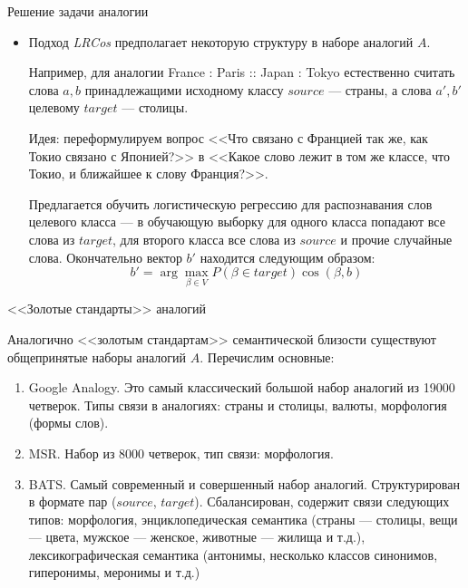 \documentclass[9pt]{beamer}
\begin{document}
\begin{frame}{Решение задачи аналогии}
\begin{itemize}
\item Подход \textit{LRCos} предполагает некоторую структуру в наборе аналогий $A$. 
\vspace{\baselineskip}

Например, для аналогии France : Paris :: Japan : Tokyo естественно считать слова $a, b$ принадлежащими исходному классу $source$ --- страны, а слова $a', b'$ целевому $target$ --- столицы. 
\vspace{\baselineskip}

Идея: переформулируем вопрос <<Что связано с Францией так же, как Токио связано с Японией?>> в <<Какое слово лежит в том же классе, что Токио, и ближайшее к слову Франция?>>.
\vspace{\baselineskip}

Предлагается обучить логистическую регрессию для распознавания слов целевого класса --- в обучающую выборку для одного класса попадают все слова из $target$, для второго класса все слова из $source$ и прочие случайные слова. Окончательно вектор $b'$ находится следующим образом:
    \begin{equation}
        b' = \arg \max_{\beta \in V} P(\beta \in target) \cos(\beta, b)
    \end{equation}    
\end{itemize}
    
\end{frame}

\begin{frame}{<<Золотые стандарты>> аналогий}

Аналогично <<золотым стандартам>> семантической близости существуют общепринятые наборы аналогий $A$. Перечислим основные:
    \begin{enumerate}
        \item Google Analogy.
        Это самый классический большой набор аналогий из 19000 четверок. Типы связи в аналогиях: страны и столицы, валюты, морфология (формы слов).
        \item MSR.
        Набор из 8000 четверок, тип связи: морфология.
        \item BATS. Самый современный и совершенный набор аналогий. Структурирован в формате пар  ($source$, $target$). Сбалансирован, содержит связи следующих типов: морфология, энциклопедическая семантика (страны --- столицы, вещи --- цвета, мужское --- женское, животные --- жилища и т.д.), лексикографическая семантика (антонимы, несколько классов синонимов, гиперонимы, меронимы и т.д.)
    \end{enumerate}
    
\end{frame}
\end{document}
